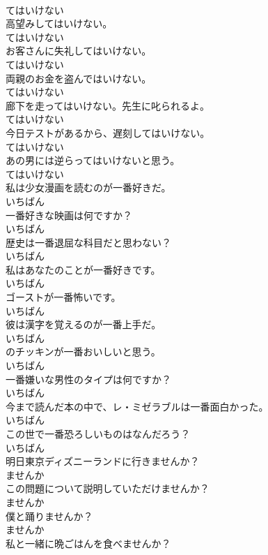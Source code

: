 \documentclass[8pt]{extreport}
\begin{document}
\begin{CJK}{UTF8}{min}
\\	てはいけない
\\	高望みしてはいけない。	
\\	てはいけない
\\	お客さんに失礼してはいけない。	
\\	てはいけない
\\	両親のお金を盗んではいけない。	
\\	てはいけない
\\	廊下を走ってはいけない。先生に叱られるよ。	
\\	てはいけない
\\	今日テストがあるから、遅刻してはいけない。	
\\	てはいけない
\\	あの男には逆らってはいけないと思う。	
\\	てはいけない
\\	私は少女漫画を読むのが一番好きだ。	
\\	いちばん
\\	一番好きな映画は何ですか？	
\\	いちばん
\\	歴史は一番退屈な科目だと思わない？	
\\	いちばん
\\	私はあなたのことが一番好きです。	
\\	いちばん
\\	ゴーストが一番怖いです。	
\\	いちばん
\\	彼は漢字を覚えるのが一番上手だ。	
\\	いちばん
\\	のチッキンが一番おいしいと思う。	
\\	いちばん
\\	一番嫌いな男性のタイプは何ですか？	
\\	いちばん
\\	今まで読んだ本の中で、レ・ミゼラブルは一番面白かった。	
\\	いちばん
\\	この世で一番恐ろしいものはなんだろう？	
\\	いちばん
\\	明日東京ディズニーランドに行きませんか？	
\\	ませんか
\\	この問題について説明していただけませんか？	
\\	ませんか
\\	僕と踊りませんか？	
\\	ませんか
\\	私と一緒に晩ごはんを食べませんか？	

\end{CJK}
\end{document}
